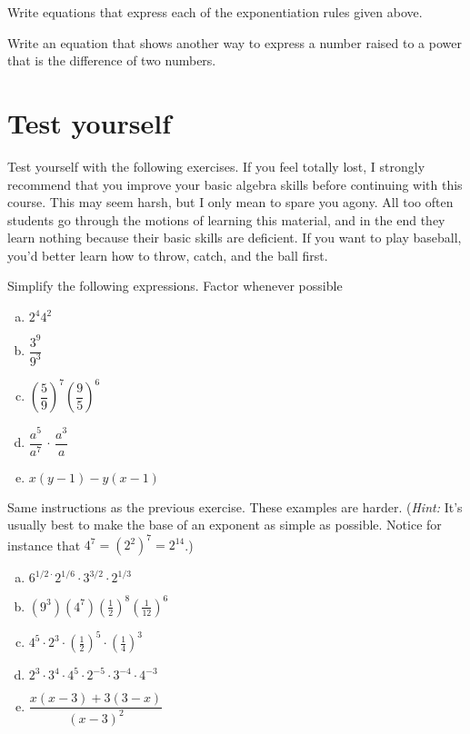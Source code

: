 \begin{exercise}{5}
Write equations that express each of the exponentiation rules given above.
\end{exercise}
\begin{exercise}{6}
Write an equation that shows another way to express a number raised to a power that is the difference of two numbers.
\end{exercise}

\section{Test yourself}
Test yourself with the following exercises. If you feel totally lost, I strongly recommend that you improve your basic algebra skills before continuing with this course. This may seem harsh, but I only mean to spare you agony. All too often students go through the motions of learning this material, and in the end they learn nothing because their basic skills are deficient. If you want to play baseball, you'd better learn how to throw, catch, and  the ball first.

\begin{exercise}{7}
Simplify the following expressions. Factor whenever possible
\begin{multicols}{2}
\begin{enumerate}[(a)]
\item
$ 2^4 4^2$
\item
$ \dfrac{3^9}{9^3}$
\item
$\left( \dfrac{5}{9} \right)^7 \left( \dfrac{9}{5} \right)^6$
\item
$\dfrac{a^5}{a^7} \, \cdot \, \dfrac{a^3}{a}$
\item
$x(y-1) - y(x-1)$
\end{enumerate}
\end{multicols}
\end{exercise}


\begin{exercise}{8}
Same instructions as the previous exercise. These examples are  harder. (\emph{Hint:} It's usually best to make the base of an exponent as simple as possible. Notice for instance that $4^7 = (2^2)^7 = 2^{14}$.)
\begin{multicols}{2}
\begin{enumerate}[(a)]
\item
$6^{1/2\cdot}2^{1/6}\cdot3^{3/2}\cdot2^{1/3}$
\item
$(9^3)(4^7)\left(\frac{1}{2}\right)^8\left(\frac{1}{12}\right)^6$
\item
$4^5 \cdot 2^3 \cdot \left(\frac{1}{2}\right)^5 \cdot \left( \frac{1}{4} \right) ^3$
\item
$2^3 \cdot 3^4 \cdot 4^5 \cdot 2^{-5} \cdot 3^{-4} \cdot 4^{-3}$
\item
$\dfrac{x(x-3)+3(3-x)}{(x-3)^2}$
\end{enumerate}
\end{multicols}
\end{exercise}


